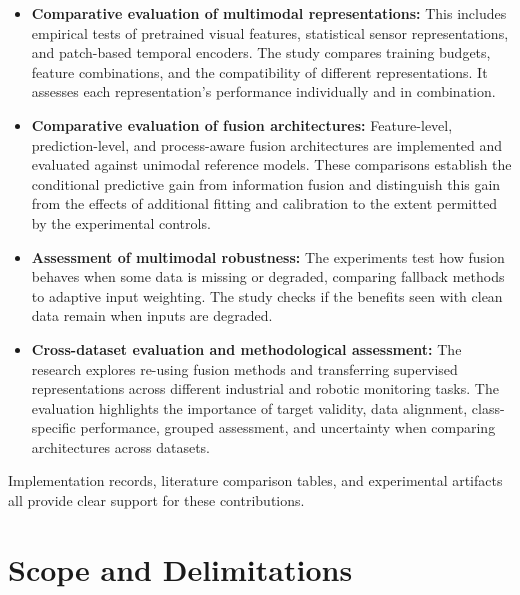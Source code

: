 \begin{itemize}

\item \textbf{Comparative evaluation of multimodal representations:}
This includes empirical tests of pretrained visual features,
statistical sensor representations, and patch-based temporal
encoders. The study compares training budgets, feature combinations,
and the compatibility of different representations. It assesses
each representation's performance individually and in combination.

\item \textbf{Comparative evaluation of fusion architectures:}
Feature-level, prediction-level, and process-aware fusion
architectures are implemented and evaluated against unimodal
reference models. These comparisons establish the conditional
predictive gain from information fusion and distinguish this
gain from the effects of additional fitting and calibration
to the extent permitted by the experimental controls.

\item \textbf{Assessment of multimodal robustness:}
The experiments test how fusion behaves when some data is
missing or degraded, comparing fallback methods to adaptive
input weighting. The study checks if the benefits seen with
clean data remain when inputs are degraded.

\item \textbf{Cross-dataset evaluation and methodological assessment:}
The research explores re-using fusion methods and transferring
supervised representations across different industrial and
robotic monitoring tasks. The evaluation highlights the
importance of target validity, data alignment, class-specific
performance, grouped assessment, and uncertainty when comparing
architectures across datasets.

\end{itemize}

Implementation records, literature comparison tables, and
experimental artifacts all provide clear support for these
contributions.



\section{Scope and Delimitations}

